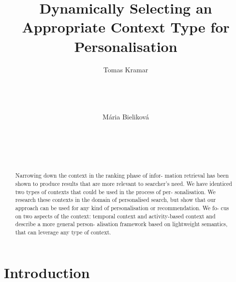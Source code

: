 \documentclass{acm_proc_article-sp} %
\begin{document}
\title{Dynamically Selecting an Appropriate Context Type
for Personalisation}



\author{
\alignauthor
Tomas Kramar\\
       \\
       \\
       \\
       \\
\alignauthor
Mária Bieliková\\
       \\
       \\
       \\
       \\
}

\maketitle

\begin{abstract}
Narrowing down the context in the ranking phase of infor-
mation retrieval has been shown to produce results that are
more relevant to searcher's need. We have identiced two
types of contexts that could be used in the process of per-
sonalisation. We research these contexts in the domain of
personalised search, but show that our approach can be used
for any kind of personalisation or recommendation. We fo-
cus on two aspects of the context: temporal context and
activity-based context and describe a more general person-
alisation framework based on lightweight semantics, that can
leverage any type of context.
\end{abstract}




\section{Introduction}
\end{document}
